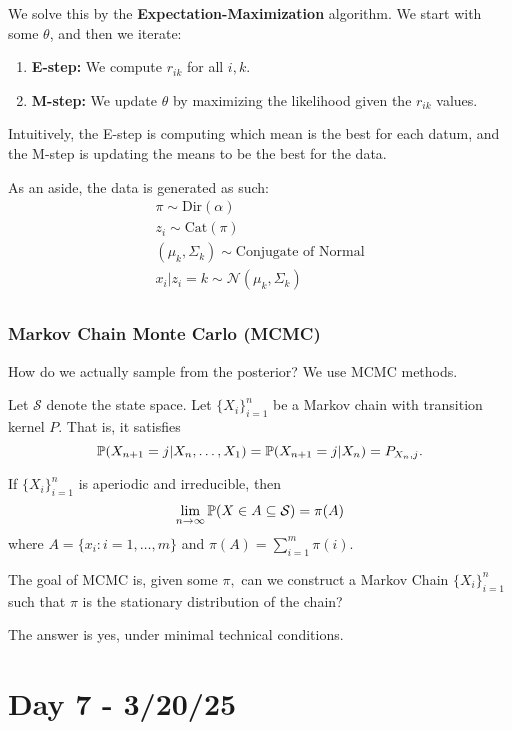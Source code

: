 \documentclass{chaistyle}
\begin{document}
We solve this by the \textbf{Expectation-Maximization} algorithm. We start with some \(\theta\), and then we iterate: \begin{enumerate}
    \item \textbf{E-step:} We compute \(r_{ik}\) for all \(i,k.\)
    \item \textbf{M-step:} We update \(\theta\) by maximizing the likelihood given the \(r_{ik}\) values.
\end{enumerate}
Intuitively, the E-step is computing which mean is the best for each datum, and the M-step is updating the means to be the best for the data.
\vspace{4mm}
\begin{remark}
    As an aside, the data is generated as such: \begin{align*}
        \pi\sim\text{Dir}(\alpha) \\
        z_i\sim\text{Cat}(\pi) \\
        (\mu_k,\Sigma_k)\sim\text{Conjugate of Normal} \\
        x_i|z_i=k\sim \mathcal{N}(\mu_k,\Sigma_k) \\
    \end{align*}
\end{remark}
\subsubsection*{Markov Chain Monte Carlo (MCMC)}
How do we actually sample from the posterior? We use MCMC methods.

Let \(\mathcal{S}\) denote the state space. Let \(\{X_i\}_{i=1}^n\) be a Markov chain with transition kernel \(P.\) That is, it satisfies \[\P(X_{n+1}=j|X_n,\dots,X_1)=\P(X_{n+1}=j|X_n)=P_{X_n,j}.\] 
\begin{theorem*}
    If \(\{X_i\}_{i=1}^n\) is aperiodic and irreducible, then \[\lim_{n \to \infty} \P(X\in A\subseteq\mathcal{S})=\pi(A)\] where \(A=\{x_{i}:i=1,\dots,m\}\) and \(\pi(A)=\sum_{i=1}^{m} \pi(i).\)
\end{theorem*}
The goal of MCMC is, given some \(\pi,\) can we construct a Markov Chain \(\{X_i\}_{i=1}^n\) such that \(\pi\) is the stationary distribution of the chain?

The answer is yes, under minimal technical conditions.
\section*{Day 7 - 3/20/25}
\end{document}
